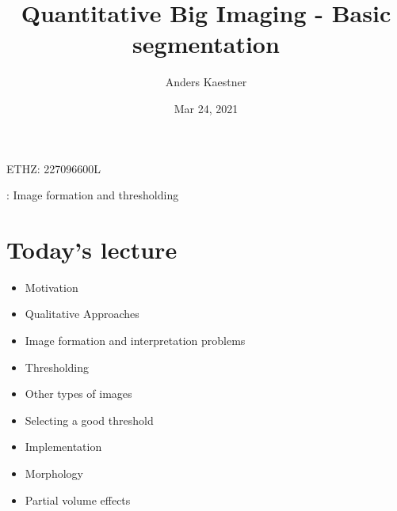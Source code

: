 \documentclass[letterpaper,10pt,english]{sphinxmanual}
\title{Quantitative Big Imaging - Basic segmentation}
\date{Mar 24, 2021}
\author{Anders Kaestner}
\begin{document}
\pagestyle{empty}
\sphinxmaketitle
\pagestyle{plain}
\sphinxtableofcontents
\pagestyle{normal}
\label{\detokenize{04-BasicSegmentation::doc}}




\sphinxAtStartPar
{} ETHZ: 227\sphinxhyphen{}0966\sphinxhyphen{}00L

\sphinxAtStartPar
{}: Image formation and thresholding






\chapter{Today’s lecture}
\label{\detokenize{04-BasicSegmentation:today-s-lecture}}\begin{itemize}
\item {} 
\sphinxAtStartPar
Motivation

\item {} 
\sphinxAtStartPar
Qualitative Approaches

\item {} 
\sphinxAtStartPar
Image formation and interpretation problems

\item {} 
\sphinxAtStartPar
Thresholding

\item {} 
\sphinxAtStartPar
Other types of images

\item {} 
\sphinxAtStartPar
Selecting a good threshold

\item {} 
\sphinxAtStartPar
Implementation

\item {} 
\sphinxAtStartPar
Morphology

\item {} 
\sphinxAtStartPar
Partial volume effects

\end{itemize}
\end{document}
